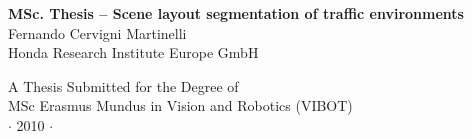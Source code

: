 
\newpage
\thispagestyle{empty}


\vspace*{2cm}
\begin{center}
{\Large\bf MSc. Thesis -- Scene layout segmentation of traffic environments\\} \vspace{2cm} {\large
Fernando Cervigni Martinelli\\
\vspace{1cm}
Honda Research Institute Europe GmbH}

\end{center}

\vspace{7cm}
\begin{center}
{\large A Thesis Submitted for the Degree of \\MSc Erasmus Mundus
in Vision and Robotics (VIBOT) \\\vspace{0.3cm} $\cdot$ 2010
$\cdot$}
\end{center}
\singlespacing


